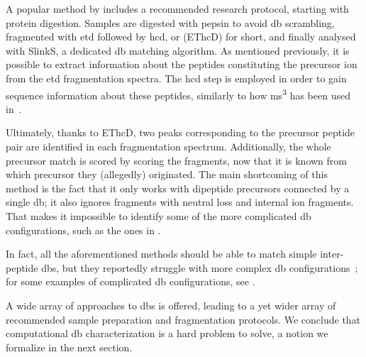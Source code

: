 A popular method by \citet{liu2014facilitating} includes a recommended research protocol, starting with protein digestion. Samples are digested with pepsin to avoid \gls*{db} scrambling, fragmented with \gls*{etd} followed by \gls*{hcd}, or (EThcD) for short, and finally analysed with SlinkS, a dedicated \gls*{db} matching algorithm. As mentioned previously, it is possible to extract information about the peptides constituting the precursor ion from the \gls*{etd} fragmentation spectra. The \gls*{hcd} step is employed in order to gain sequence information about these peptides, similarly to how \gls*{ms}\textsuperscript{3} has been used in~\cite{wu2009mass}.

Ultimately, thanks to EThcD, two peaks corresponding to the precursor peptide pair are identified in each fragmentation spectrum. Additionally, the whole precursor match is scored by scoring the fragments, now that it is known from which precursor they (allegedly) originated. The main shortcoming of this method is the fact that it only works with dipeptide precursors connected by a single \gls*{db}; it also ignores fragments with neutral loss and internal ion fragments. That makes it impossible to identify some of the more complicated \gls*{db} configurations, such as the ones in .

In fact, all the aforementioned methods should be able to match simple inter-peptide \glspl*{db}, but they reportedly struggle with more complex \gls*{db} configurations~\cite{lakbub2018recent}; for some examples of complicated \gls*{db} configurations, see .

A wide array of approaches to \glspl*{db} is offered, leading to a yet wider array of recommended sample preparation and fragmentation protocols. We conclude that computational \gls*{db} characterization is a hard problem to solve, a notion we formalize in the next section.

